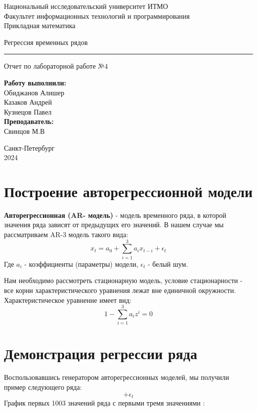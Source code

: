 \documentclass{article}
\begin{document}
\begin{center}
    Национальный исследовательский университет ИТМО\\
    Факультет информационных технологий и программирования\\
    Прикладная математика
\end{center}
\vspace{20em}
\begin{center}
    {\Large Регрессия временных рядов}
    \vspace{3pt}
    \hrule
    \vspace{3pt}
    Отчет по лабораторной работе №4
\end{center}
\vspace{15em}
\begin{flushright}
    \textbf{ Работу выполнили: } \\
    Обиджанов Алишер\\
    Казаков Андрей\\
    Кузнецов Павел\\
    \vspace{1em}
    \textbf{ Преподаватель: } \\
    Свинцов М.В
\end{flushright}
\vspace{12em}
\begin{center}
    Санкт-Петербург \\
    2024
\end{center}
\newpage


\section{Построение авторегрессионной модели}
\textbf{Авторегрессионная (AR- модель)} - модель временного ряда, в которой значения ряда зависят от предыдущих его значений.
В нашем случае мы рассматриваем AR-3 модель такого вида:
$$ x_t = a_0 + \sum_{i=1}^{3} a_i x_{t - i} + \epsilon_t $$
Где $a_i$ - коэффициенты (параметры) модели, $\epsilon_t$ - белый шум.

Нам необходимо рассмотреть стационарную модель, условие стационарности - все корни характеристического уравнения лежат вне единичной окружности.
Характеристическое уравнение имеет вид:
$$ 1 - \sum_{i=1}^3 a_i z^i = 0 $$

\section{Демонстрация регрессии ряда}
Воспользовавшись генератором авторегрессионных моделей, мы получили пример следующего ряда:
$$ + \epsilon_t$$
График первых 1003 значений ряда с первыми тремя значениями $$:
\end{document}

